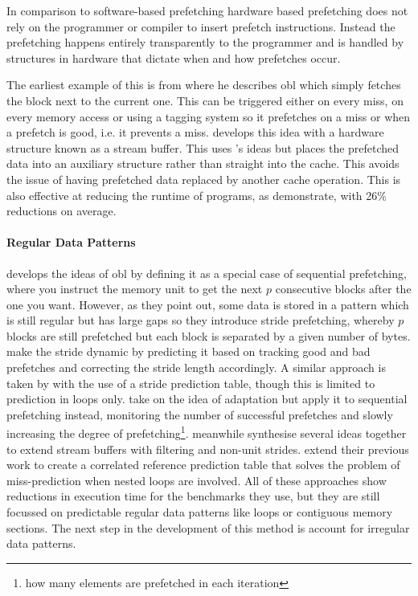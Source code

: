 In comparison to software-based prefetching hardware based prefetching does not rely on the programmer or compiler to insert prefetch instructions. Instead the prefetching happens entirely transparently to the programmer and is handled by structures in hardware that dictate when and how prefetches occur. 

The earliest example of this is from \citet{smithCacheMemories1982} where he describes \gls{obl} which simply fetches the block next to the current one. This can be triggered either on every miss, on every memory access or using a tagging system so it prefetches on a miss or when a prefetch is good, i.e. it prevents a miss. \citet{jouppiImprovingDirectmappedCache1990} develops this idea with a hardware structure known as a stream buffer. This uses \citeauthor{smithCacheMemories1982}'s ideas but places the prefetched data into an auxiliary structure rather than straight into the cache. This avoids the issue of having prefetched data replaced by another cache operation. This is also effective at reducing the runtime of programs, as \citet{farkasHowUsefulAre1995} demonstrate, with 26\% reductions on average.

\paragraph{Regular Data Patterns}

\citet{fuDataPrefetchingMultiprocessor1991} develops the ideas of \gls{obl} by defining it as a special case of sequential prefetching, where you instruct the memory unit to get the next $p$ consecutive blocks after the one you want. However, as they point out, some data is stored in a pattern which is still regular but has large gaps so they introduce stride prefetching, whereby $p$ blocks are still prefetched but each block is separated by a given number of bytes. \citet{baerEffectiveOnchipPreloading1991} make the stride dynamic by predicting it based on tracking good and bad prefetches and correcting the stride length accordingly. A similar approach is taken by \citet{fuStrideDirectedPrefetching1992} with the use of a stride prediction table, though this is limited to prediction in loops only. \citet{dahlgrenFixedAdaptiveSequential1993} take on the idea of adaptation but apply it to sequential prefetching instead, monitoring the number of successful prefetches and slowly increasing the degree of prefetching\footnote{how many elements are prefetched in each iteration}. \citet{palacharlaEvaluatingStreamBuffers1994} meanwhile synthesise several ideas together to extend stream buffers with filtering and non-unit strides. \citet{chenEffectiveHardwarebasedData1995} extend their previous work \cite{baerEffectiveOnchipPreloading1991} to create a correlated reference prediction table that solves the problem of miss-prediction when nested loops are involved. All of these approaches show reductions in execution time for the benchmarks they use, but they are still focussed on predictable regular data patterns like loops or contiguous memory sections. The next step in the development of this method is account for irregular data patterns.

